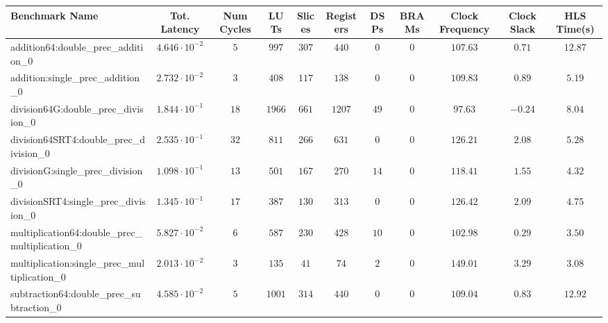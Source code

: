 \begin{tabular}{|l|c|c|c|c|c|c|c|c|c|c|}
\hline
Benchmark Name                                   & Tot. Latency            & Num Cycles & LUTs     & Slices   & Registers & DSPs   & BRAMs & Clock Frequency & Clock Slack & HLS Time(s) \\
\hline
addition64:double\_prec\_addition\_0             & $ 4.646 \cdot 10^{-2} $ & $ 5      $ & $ 997  $ & $ 307  $ & $ 440   $ & $ 0  $ & $ 0 $ & $ 107.63      $ & $ 0.71    $ & $ 12.87   $ \\
addition:single\_prec\_addition\_0               & $ 2.732 \cdot 10^{-2} $ & $ 3      $ & $ 408  $ & $ 117  $ & $ 138   $ & $ 0  $ & $ 0 $ & $ 109.83      $ & $ 0.89    $ & $ 5.19    $ \\
division64G:double\_prec\_division\_0            & $ 1.844 \cdot 10^{-1} $ & $ 18     $ & $ 1966 $ & $ 661  $ & $ 1207  $ & $ 49 $ & $ 0 $ & $ 97.63       $ & $ -0.24   $ & $ 8.04    $ \\
division64SRT4:double\_prec\_division\_0         & $ 2.535 \cdot 10^{-1} $ & $ 32     $ & $ 811  $ & $ 266  $ & $ 631   $ & $ 0  $ & $ 0 $ & $ 126.21      $ & $ 2.08    $ & $ 5.28    $ \\
divisionG:single\_prec\_division\_0              & $ 1.098 \cdot 10^{-1} $ & $ 13     $ & $ 501  $ & $ 167  $ & $ 270   $ & $ 14 $ & $ 0 $ & $ 118.41      $ & $ 1.55    $ & $ 4.32    $ \\
divisionSRT4:single\_prec\_division\_0           & $ 1.345 \cdot 10^{-1} $ & $ 17     $ & $ 387  $ & $ 130  $ & $ 313   $ & $ 0  $ & $ 0 $ & $ 126.42      $ & $ 2.09    $ & $ 4.75    $ \\
multiplication64:double\_prec\_multiplication\_0 & $ 5.827 \cdot 10^{-2} $ & $ 6      $ & $ 587  $ & $ 230  $ & $ 428   $ & $ 10 $ & $ 0 $ & $ 102.98      $ & $ 0.29    $ & $ 3.50    $ \\
multiplication:single\_prec\_multiplication\_0   & $ 2.013 \cdot 10^{-2} $ & $ 3      $ & $ 135  $ & $ 41   $ & $ 74    $ & $ 2  $ & $ 0 $ & $ 149.01      $ & $ 3.29    $ & $ 3.08    $ \\
subtraction64:double\_prec\_subtraction\_0       & $ 4.585 \cdot 10^{-2} $ & $ 5      $ & $ 1001 $ & $ 314  $ & $ 440   $ & $ 0  $ & $ 0 $ & $ 109.04      $ & $ 0.83    $ & $ 12.92   $ \\

\end{tabular}
